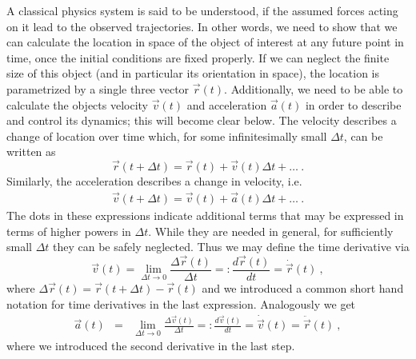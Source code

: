 \documentclass[12pt,ngerman,american]{iopart}
\begin{document}
A  classical physics system is said to be understood, if the assumed forces acting on it lead to the observed trajectories.
In other words, we need to show that we can calculate the location in space of the object of interest at any future point in time, once the initial conditions are fixed properly.
If we can neglect the finite size of this object (and in particular its orientation in space), the location is parametrized by a single three vector $\vec r(t)$.
Additionally, we need to be able to calculate the objects velocity $\vec v(t)$ and acceleration $\vec a(t)$ in order to describe and control its dynamics; this will become clear below. The velocity describes a change of location over time which, for some infinitesimally small $\Delta t$, can be written as
\begin{equation}\label{eq:x_update}
\vec r(t+\Delta t) = \vec r(t) + \vec v(t) \Delta t + \ldots \ . \label{eq:vdef}
\end{equation}
Similarly, the acceleration describes a change in velocity, i.e.
\begin{eqnarray}\label{eq:v_update}
\vec v(t+\Delta t) = \vec v(t) + \vec a(t) \Delta t + \ldots\ . \label{eq:adef}
\end{eqnarray}
The dots in these expressions indicate additional terms that may be expressed in terms of higher powers in $\Delta t$. While they are needed in general, for sufficiently small $\Delta t$ they can be safely neglected.
Thus we may define the time derivative via
\begin{equation}
\vec v(t) = \lim_{\Delta t\to 0} \frac{\Delta \vec r(t)}{\Delta t} =: \frac{d\vec r(t)}{d t}  = \dot{\vec  r}(t) \ ,
\end{equation}
where $\Delta \vec r(t)=\vec r(t+\Delta t)-\vec r(t)$ and we introduced a common short hand notation for time derivatives in the last expression.
Analogously we get
\begin{eqnarray}
\vec a(t) &=& \lim_{\Delta t\to 0} \frac{\Delta \vec v(t)}{\Delta t} =: \frac{d\vec v(t)}{dt}  = \dot{\vec v}(t)  = \ddot{\vec r}(t) \ ,
\end{eqnarray}
where we introduced the second derivative in the last step.
\end{document}
